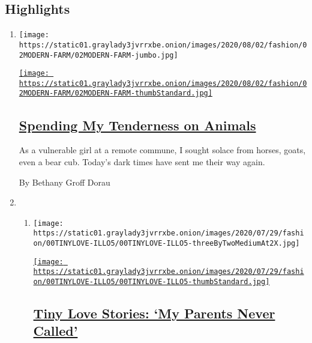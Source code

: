 \hypertarget{highlights}{%
\subsection{Highlights}\label{highlights}}

\begin{enumerate}
\def\labelenumi{\arabic{enumi}.}
\item
  \texttt{[image: https://static01.graylady3jvrrxbe.onion/images/2020/08/02/fashion/02MODERN-FARM/02MODERN-FARM-jumbo.jpg]}

  \href{/2020/07/31/style/modern-love-spending-tenderness-on-animals.html}{\texttt{[image: https://static01.graylady3jvrrxbe.onion/images/2020/08/02/fashion/02MODERN-FARM/02MODERN-FARM-thumbStandard.jpg]}}

  \hypertarget{spending-my-tenderness-on-animals}{%
  \subsection{\texorpdfstring{\href{/2020/07/31/style/modern-love-spending-tenderness-on-animals.html}{Spending
  My Tenderness on
  Animals}}{Spending My Tenderness on Animals}}\label{spending-my-tenderness-on-animals}}

  As a vulnerable girl at a remote commune, I sought solace from horses,
  goats, even a bear cub. Today's dark times have sent me their way
  again.

  By Bethany Groff Dorau
\item
  \begin{enumerate}
  \def\labelenumii{\arabic{enumii}.}
  \item
    \texttt{[image: https://static01.graylady3jvrrxbe.onion/images/2020/07/29/fashion/00TINYLOVE-ILLO5/00TINYLOVE-ILLO5-threeByTwoMediumAt2X.jpg]}

    \href{/2020/07/28/style/tiny-modern-love-stories-coronavirus-my-parents-never-called.html}{\texttt{[image: https://static01.graylady3jvrrxbe.onion/images/2020/07/29/fashion/00TINYLOVE-ILLO5/00TINYLOVE-ILLO5-thumbStandard.jpg]}}

    \hypertarget{tiny-love-stories-my-parents-never-called}{%
    \subsection{\texorpdfstring{\href{/2020/07/28/style/tiny-modern-love-stories-coronavirus-my-parents-never-called.html}{Tiny
    Love Stories: `My Parents Never
    Called'}}{Tiny Love Stories: `My Parents Never Called'}}\label{tiny-love-stories-my-parents-never-called}}


\end{enumerate}
\end{enumerate}
